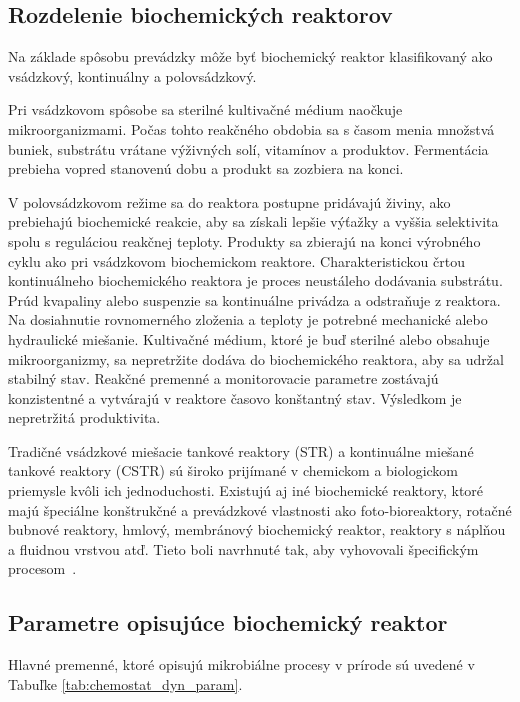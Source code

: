 \subsection{Rozdelenie biochemických reaktorov}
Na základe spôsobu prevádzky môže byť biochemický reaktor klasifikovaný ako vsádzkový, kontinuálny a polovsádzkový.
 
Pri vsádzkovom spôsobe sa sterilné kultivačné médium naočkuje mikroorganizmami. Počas tohto reakčného obdobia sa s časom menia množstvá buniek, substrátu vrátane výživných solí, vitamínov a produktov. Fermentácia prebieha vopred stanovenú dobu a produkt sa zozbiera na konci.

V polovsádzkovom režime sa do reaktora postupne pridávajú živiny, ako prebiehajú biochemické reakcie, aby sa získali lepšie výťažky a vyššia selektivita spolu s reguláciou reakčnej teploty. Produkty sa zbierajú na konci výrobného cyklu ako pri vsádzkovom biochemickom reaktore. Charakteristickou črtou kontinuálneho biochemického reaktora je proces neustáleho dodávania substrátu. Prúd kvapaliny alebo suspenzie sa kontinuálne privádza a odstraňuje z reaktora. Na dosiahnutie rovnomerného zloženia a teploty je potrebné mechanické alebo hydraulické miešanie. Kultivačné médium, ktoré je buď sterilné alebo obsahuje mikroorganizmy, sa nepretržite dodáva do biochemického reaktora, aby sa udržal stabilný stav. Reakčné premenné a monitorovacie parametre zostávajú konzistentné a vytvárajú v reaktore časovo konštantný stav. Výsledkom je nepretržitá produktivita.

Tradičné vsádzkové miešacie tankové reaktory (STR) a kontinuálne miešané tankové reaktory (CSTR) sú široko prijímané v chemickom a biologickom priemysle kvôli ich jednoduchosti. Existujú aj iné biochemické reaktory, ktoré majú špeciálne konštrukčné a prevádzkové vlastnosti ako foto-bioreaktory, rotačné bubnové reaktory, hmlový, membránový biochemický reaktor, reaktory s náplňou a fluidnou vrstvou atď. Tieto boli navrhnuté tak, aby vyhovovali špecifickým procesom~\cite{kaushik:bioreactors:2014}.

\subsection{Parametre opisujúce biochemický reaktor}
Hlavné premenné, ktoré opisujú mikrobiálne procesy v prírode sú uvedené v Tabuľke \ref{tab:chemostat_dyn_param}.

